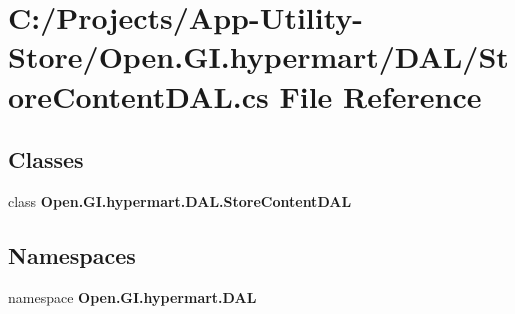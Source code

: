 \section{C\+:/\+Projects/\+App-\/\+Utility-\/\+Store/\+Open.G\+I.\+hypermart/\+D\+A\+L/\+Store\+Content\+D\+AL.cs File Reference}
\label{_store_content_d_a_l_8cs}
\subsection*{Classes}
\begin{DoxyCompactItemize}
\item 
class \textbf{ Open.\+G\+I.\+hypermart.\+D\+A\+L.\+Store\+Content\+D\+AL}
\end{DoxyCompactItemize}
\subsection*{Namespaces}
\begin{DoxyCompactItemize}
\item 
namespace \textbf{ Open.\+G\+I.\+hypermart.\+D\+AL}
\end{DoxyCompactItemize}
